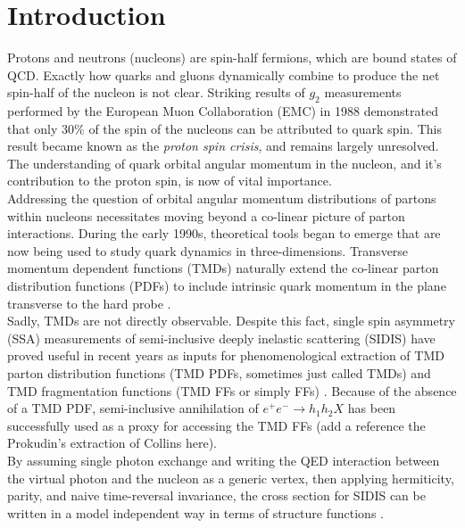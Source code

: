 \chapter{Introduction}

Protons and neutrons (nucleons) are spin-half fermions, which are bound states of QCD.  Exactly how quarks and gluons dynamically combine to produce the net spin-half of the nucleon is not clear.  Striking results of $g_2$ measurements performed by the European Muon Collaboration (EMC) in 1988 \cite{pdfs-leader:1988} demonstrated that only $30\%$ of the spin of the nucleons can be attributed to quark spin.  This result became known as the \textit{proton spin crisis}, and remains largely unresolved.  The understanding of quark orbital angular momentum in the nucleon, and it's contribution to the proton spin, is now of vital importance.  \\

Addressing the question of orbital angular momentum distributions of partons within nucleons necessitates moving beyond a co-linear picture of parton interactions.   During the early 1990s, theoretical tools began to emerge that are now being used to study quark dynamics in three-dimensions.  Transverse momentum dependent functions (TMDs) naturally extend the co-linear parton distribution functions (PDFs) to include intrinsic quark momentum in the plane transverse to the hard probe \cite{tmds-mulders:1995, tmds-bacchetta:2006}.  \\

Sadly, TMDs are not directly observable.  Despite this fact, single spin asymmetry (SSA) measurements of semi-inclusive deeply inelastic scattering (SIDIS) have proved useful in recent years as inputs for phenomenological extraction of TMD parton distribution functions (TMD PDFs, sometimes just called TMDs) and TMD fragmentation functions (TMD FFs or simply FFs) \cite{tmds-airapetian:2009, tmds-airapetian:2012, tmds-aghasyan:2017}.  Because of the absence of a TMD PDF, semi-inclusive annihilation of $e^+ e^- \rightarrow h_1 h_2 X$ has been successfully used as a proxy for accessing the TMD FFs (add a reference the Prokudin's extraction of Collins here).  \\

By assuming single photon exchange and writing the QED interaction between the virtual photon and the nucleon as a generic vertex, then applying hermiticity, parity, and naive time-reversal invariance, the cross section for SIDIS can be written in a model independent way in terms of structure functions \cite{tmds-mulders:1995, tmds-bacchetta:2006}.  

